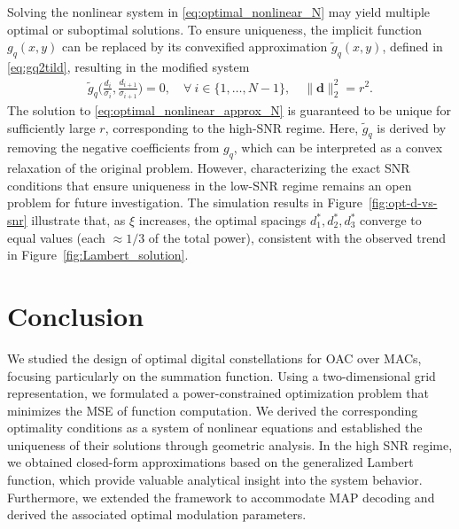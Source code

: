 \documentclass[journal,12pt,onecolumn,draftclsnofoot]{IEEEtran}
\theoremstyle{definition}
\begin{document}
Solving the nonlinear system in \eqref{eq:optimal_nonlinear_N} may yield multiple optimal or suboptimal solutions.  To ensure uniqueness, the implicit function $g_q(x,y)$ can be replaced by its convexified approximation $\tilde{g}_q(x,y)$, defined in \eqref{eq:gq2tild}, resulting in the modified system
\begin{align}
\label{eq:optimal_nonlinear_approx_N}
    \tilde{g}_q\Big(\frac{{d}_i}{\sigma_i},\frac{{d}_{i+1}}{\sigma_{i+1}}\Big) = 0, \quad \forall~i \in \{1,\ldots, N-1\}, \quad \|\bm{{d}}\|_2^2 = r^2.
\end{align}
The solution to \eqref{eq:optimal_nonlinear_approx_N} is guaranteed to be unique for sufficiently large $r$, corresponding to the high-SNR regime.  Here, $\tilde{g}_q$ is derived by removing the negative coefficients from $g_q$, which can be interpreted as a convex relaxation of the original problem.  However, characterizing the exact SNR conditions that ensure uniqueness in the low-SNR regime remains an open problem for future investigation. The simulation results in Figure~\ref{fig:opt-d-vs-snr} illustrate that, as $\xi$ increases, the optimal spacings $d_1^{*}, d_2^{*}, d_3^{*}$ converge to equal values (each $\approx 1/3$ of the total power), consistent with the observed trend in Figure~\ref{fig:Lambert_solution}.








\section{Conclusion}\label{sec:conclusion}

We studied the design of optimal digital constellations for OAC over MACs, focusing particularly on the summation function.  Using a two-dimensional grid representation, we formulated a power-constrained optimization problem that minimizes the MSE of function computation.  We derived the corresponding optimality conditions as a system of nonlinear equations and established the uniqueness of their solutions through geometric analysis. 
In the high SNR regime, we obtained closed-form approximations based on the generalized Lambert function, which provide valuable analytical insight into the system behavior. Furthermore, we extended the framework to accommodate MAP decoding and derived the associated optimal modulation parameters.
\end{document}
